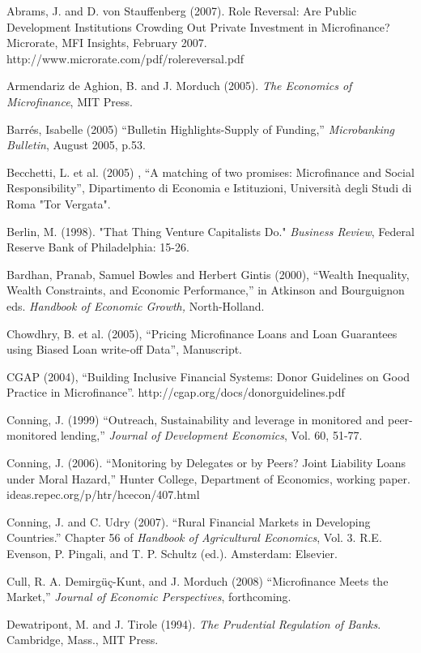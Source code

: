 \documentclass{article} %
\begin{document}
Abrams, J. and D. von Stauffenberg (2007). Role Reversal: Are Public Development Institutions Crowding Out Private Investment in Microfinance? Microrate, MFI Insights, February 2007. http://www.microrate.com/pdf/rolereversal.pdf 

Armendariz de Aghion, B. and J. Morduch (2005). \textit{The Economics of Microfinance}, MIT Press. 

Barr\'{e}s, Isabelle (2005) ``Bulletin Highlights-Supply of Funding,'' \textit{Microbanking Bulletin}, August 2005, p.53. 

Becchetti, L. et al. (2005) , ``A matching of two promises: Microfinance and Social Responsibility'', Dipartimento di Economia e Istituzioni, Universit\`{a} degli Studi di Roma "Tor Vergata". 

Berlin, M. (1998). "That Thing Venture Capitalists Do." \textit{Business Review}, Federal Reserve Bank of Philadelphia: 15-26. 

Bardhan, Pranab, Samuel Bowles and Herbert Gintis (2000), ``Wealth Inequality, Wealth Constraints, and Economic Performance,'' in Atkinson and Bourguignon eds. \textit{Handbook of Economic Growth,} North-Holland. 

Chowdhry, B. et al. (2005), ``Pricing Microfinance Loans and Loan Guarantees using Biased Loan write-off Data'', Manuscript. 

CGAP (2004), ``Building Inclusive Financial Systems: Donor Guidelines on Good Practice in Microfinance''. http://cgap.org/docs/donorguidelines.pdf 

Conning, J. (1999) ``Outreach, Sustainability and leverage in monitored and peer-monitored lending,'' \textit{Journal of Development Economics}, Vol. 60, 51-77. 

Conning, J. (2006). ``Monitoring by Delegates or by Peers? Joint Liability Loans under Moral Hazard,'' Hunter College, Department of Economics, working paper. ideas.repec.org/p/htr/hcecon/407.html 

Conning, J. and C. Udry (2007). ``Rural Financial Markets in Developing Countries.'' Chapter 56 of \textit{Handbook of Agricultural Economics}, Vol. 3.  R.E. Evenson, P. Pingali, and T. P. Schultz (ed.).  Amsterdam: Elsevier.

Cull, R. A. Demirg\"{u}\c{c}-Kunt, and J. Morduch (2008) ``Microfinance Meets the Market,'' \textit{Journal of Economic Perspectives}, forthcoming.

Dewatripont, M. and J. Tirole (1994). \textit{The Prudential Regulation of Banks}. Cambridge, Mass., MIT Press. 
\end{document}
